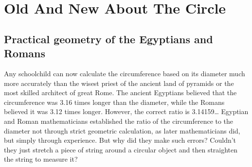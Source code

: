 



\chapter{Old And New About The Circle}
\label{ch-09}



\section{Practical geometry of the Egyptians and Romans}
\label{sec-9.1}

Any schoolchild can now calculate the circumference based on its diameter much more accurately than the wisest priest of the ancient land of pyramids or the most skilled architect of great Rome. The ancient Egyptians believed that the circumference was 3.16 times longer than the diameter, while the Romans believed it was 3.12 times longer. However, the correct ratio is 3.14159\dots{} Egyptian and Roman mathematicians established the ratio of the circumference to the diameter not through strict geometric calculation, as later mathematicians did, but simply through experience. But why did they make such errors? Couldn't they just stretch a piece of string around a circular object and then straighten the string to measure it?

